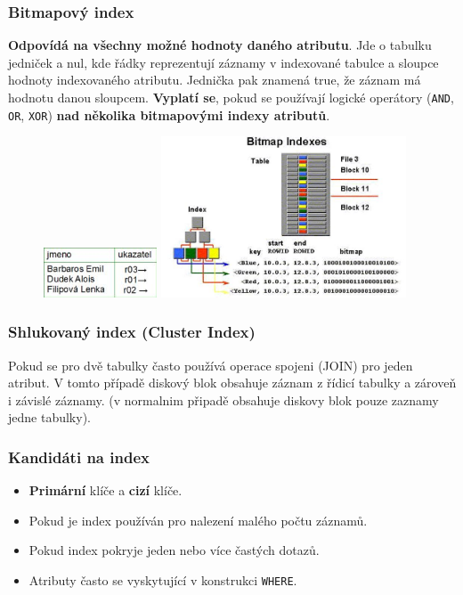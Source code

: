 \subsubsection{Bitmapový index}
\textbf{Odpovídá na všechny možné hodnoty daného atributu}. Jde o tabulku jedniček a nul, kde řádky reprezentují záznamy v indexované tabulce a sloupce hodnoty indexovaného atributu. Jednička pak znamená true, že záznam má hodnotu danou sloupcem. \textbf{Vyplatí se}, pokud se používají logické operátory (\texttt{AND}, \texttt{OR}, \texttt{XOR}) \textbf{nad několika bitmapovými indexy atributů}.

\begin{figure}[H]
	\centering
	\includegraphics[width=0.3\textwidth]{assets/index_classic.png}
	\includegraphics[width=0.65\textwidth]{assets/index_bitmap.jpg}
\end{figure}

\subsubsection{Shlukovaný index (Cluster Index)}
Pokud se pro dvě tabulky často používá operace spojeni (JOIN) pro jeden atribut. V tomto případě diskový blok obsahuje záznam z řídicí tabulky a zároveň i závislé záznamy. (v normalnim připadě obsahuje diskovy blok pouze zaznamy jedne tabulky).

\subsubsection{Kandidáti na index}
\begin{itemize}
\item \textbf{Primární} klíče a \textbf{cizí} klíče.
\item Pokud je index používán pro nalezení malého počtu záznamů.
\item Pokud index pokryje jeden nebo více častých dotazů.
\item Atributy často se vyskytující v konstrukci \texttt{WHERE}.
\end{itemize}

